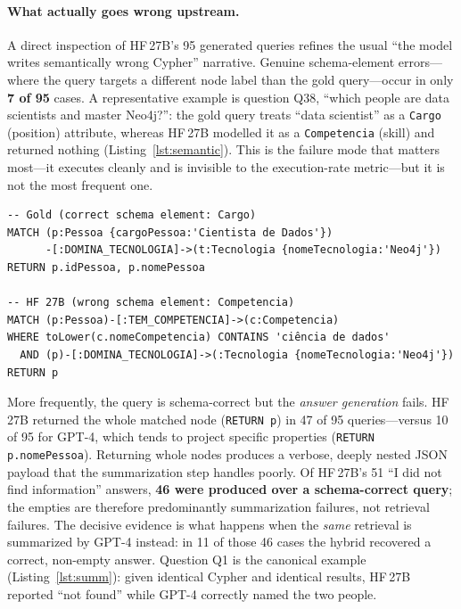 \documentclass{ceurart}
\begin{document}
\paragraph{What actually goes wrong upstream.}
A direct inspection of HF\,27B's 95 generated queries refines the usual ``the model
writes semantically wrong Cypher'' narrative. Genuine schema-element errors---where
the query targets a different node label than the gold query---occur in only
\textbf{7 of 95} cases. A representative example is question Q38, ``which people
are data scientists and master Neo4j?'': the gold query treats ``data scientist''
as a \texttt{Cargo} (position) attribute, whereas HF\,27B modelled it as a
\texttt{Competencia} (skill) and returned nothing
(Listing~\ref{lst:semantic}). This is the failure mode that matters
most---it executes cleanly and is invisible to the execution-rate
metric---but it is not the most frequent one.

\begin{lstlisting}[style=cypher,caption={A genuine semantic query error (Q38). The
gold query filters on the \texttt{Cargo} ``Cientista de Dados''; HF\,27B instead
looks for a \texttt{Competencia} containing ``ciência de dados'', which does not
exist, so the executable query returns an empty set.},label={lst:semantic}]
-- Gold (correct schema element: Cargo)
MATCH (p:Pessoa {cargoPessoa:'Cientista de Dados'})
      -[:DOMINA_TECNOLOGIA]->(t:Tecnologia {nomeTecnologia:'Neo4j'})
RETURN p.idPessoa, p.nomePessoa

-- HF 27B (wrong schema element: Competencia)
MATCH (p:Pessoa)-[:TEM_COMPETENCIA]->(c:Competencia)
WHERE toLower(c.nomeCompetencia) CONTAINS 'ciência de dados'
  AND (p)-[:DOMINA_TECNOLOGIA]->(:Tecnologia {nomeTecnologia:'Neo4j'})
RETURN p
\end{lstlisting}

More frequently, the query is schema-correct but the \emph{answer generation}
fails. HF\,27B returned the whole matched node (\texttt{RETURN p}) in 47 of 95
queries---versus 10 of 95 for GPT-4, which tends to project specific properties
(\texttt{RETURN p.nomePessoa}). Returning whole nodes produces a verbose, deeply
nested JSON payload that the summarization step handles poorly. Of HF\,27B's 51
``I did not find information'' answers, \textbf{46 were produced over a
schema-correct query}; the empties are therefore predominantly summarization
failures, not retrieval failures. The decisive evidence is what happens when the
\emph{same} retrieval is summarized by GPT-4 instead: in 11 of those 46 cases the
hybrid recovered a correct, non-empty answer. Question Q1 is the canonical example
(Listing~\ref{lst:summ}): given identical Cypher and identical results, HF\,27B
reported ``not found'' while GPT-4 correctly named the two people.
\end{document}
